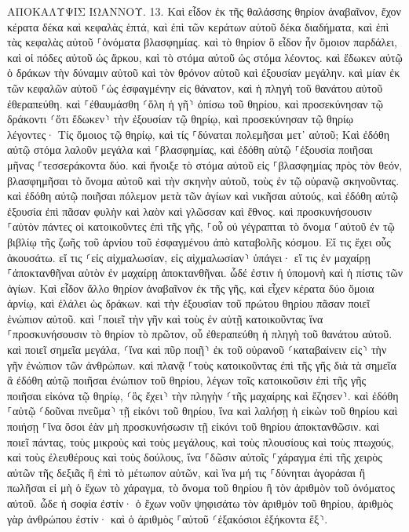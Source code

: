\documentclass[twoside, 9pt]{extreport}
\begin{document}
ΑΠΟΚΑΛΥΨΙΣ ΙΩΑΝΝΟΥ.
13.
Καὶ εἶδον ἐκ τῆς θαλάσσης θηρίον ἀναβαῖνον, ἔχον κέρατα δέκα καὶ κεφαλὰς ἑπτά, καὶ ἐπὶ τῶν κεράτων αὐτοῦ δέκα διαδήματα, καὶ ἐπὶ τὰς κεφαλὰς αὐτοῦ ⸀ὀνόματα βλασφημίας. 
καὶ τὸ θηρίον ὃ εἶδον ἦν ὅμοιον παρδάλει, καὶ οἱ πόδες αὐτοῦ ὡς ἄρκου, καὶ τὸ στόμα αὐτοῦ ὡς στόμα λέοντος. καὶ ἔδωκεν αὐτῷ ὁ δράκων τὴν δύναμιν αὐτοῦ καὶ τὸν θρόνον αὐτοῦ καὶ ἐξουσίαν μεγάλην. 
καὶ μίαν ἐκ τῶν κεφαλῶν αὐτοῦ ⸀ὡς ἐσφαγμένην εἰς θάνατον, καὶ ἡ πληγὴ τοῦ θανάτου αὐτοῦ ἐθεραπεύθη. καὶ ⸀ἐθαυμάσθη ⸂ὅλη ἡ γῆ⸃ ὀπίσω τοῦ θηρίου, 
καὶ προσεκύνησαν τῷ δράκοντι ⸂ὅτι ἔδωκεν⸃ τὴν ἐξουσίαν τῷ θηρίῳ, καὶ προσεκύνησαν τῷ θηρίῳ λέγοντες· Τίς ὅμοιος τῷ θηρίῳ, καὶ τίς ⸀δύναται πολεμῆσαι μετ᾽ αὐτοῦ; 
Καὶ ἐδόθη αὐτῷ στόμα λαλοῦν μεγάλα καὶ ⸀βλασφημίας, καὶ ἐδόθη αὐτῷ ⸀ἐξουσία ποιῆσαι μῆνας ⸀τεσσεράκοντα δύο. 
καὶ ἤνοιξε τὸ στόμα αὐτοῦ εἰς ⸀βλασφημίας πρὸς τὸν θεόν, βλασφημῆσαι τὸ ὄνομα αὐτοῦ καὶ τὴν σκηνὴν αὐτοῦ, τοὺς ἐν τῷ οὐρανῷ σκηνοῦντας. 
καὶ ἐδόθη αὐτῷ ποιῆσαι πόλεμον μετὰ τῶν ἁγίων καὶ νικῆσαι αὐτούς, καὶ ἐδόθη αὐτῷ ἐξουσία ἐπὶ πᾶσαν φυλὴν καὶ λαὸν καὶ γλῶσσαν καὶ ἔθνος. 
καὶ προσκυνήσουσιν ⸀αὐτὸν πάντες οἱ κατοικοῦντες ἐπὶ τῆς γῆς, ⸀οὗ οὐ γέγραπται τὸ ὄνομα ⸀αὐτοῦ ἐν τῷ βιβλίῳ τῆς ζωῆς τοῦ ἀρνίου τοῦ ἐσφαγμένου ἀπὸ καταβολῆς κόσμου. 
Εἴ τις ἔχει οὖς ἀκουσάτω. 
εἴ τις ⸂εἰς αἰχμαλωσίαν, εἰς αἰχμαλωσίαν⸃ ὑπάγει· εἴ τις ἐν μαχαίρῃ ⸀ἀποκτανθῆναι αὐτὸν ἐν μαχαίρῃ ἀποκτανθῆναι. ὧδέ ἐστιν ἡ ὑπομονὴ καὶ ἡ πίστις τῶν ἁγίων. 
Καὶ εἶδον ἄλλο θηρίον ἀναβαῖνον ἐκ τῆς γῆς, καὶ εἶχεν κέρατα δύο ὅμοια ἀρνίῳ, καὶ ἐλάλει ὡς δράκων. 
καὶ τὴν ἐξουσίαν τοῦ πρώτου θηρίου πᾶσαν ποιεῖ ἐνώπιον αὐτοῦ. καὶ ⸀ποιεῖ τὴν γῆν καὶ τοὺς ἐν αὐτῇ κατοικοῦντας ἵνα ⸀προσκυνήσουσιν τὸ θηρίον τὸ πρῶτον, οὗ ἐθεραπεύθη ἡ πληγὴ τοῦ θανάτου αὐτοῦ. 
καὶ ποιεῖ σημεῖα μεγάλα, ⸂ἵνα καὶ πῦρ ποιῇ⸃ ἐκ τοῦ οὐρανοῦ ⸂καταβαίνειν εἰς⸃ τὴν γῆν ἐνώπιον τῶν ἀνθρώπων. 
καὶ πλανᾷ ⸀τοὺς κατοικοῦντας ἐπὶ τῆς γῆς διὰ τὰ σημεῖα ἃ ἐδόθη αὐτῷ ποιῆσαι ἐνώπιον τοῦ θηρίου, λέγων τοῖς κατοικοῦσιν ἐπὶ τῆς γῆς ποιῆσαι εἰκόνα τῷ θηρίῳ, ⸂ὃς ἔχει⸃ τὴν πληγὴν ⸂τῆς μαχαίρης καὶ ἔζησεν⸃. 
καὶ ἐδόθη ⸀αὐτῷ ⸂δοῦναι πνεῦμα⸃ τῇ εἰκόνι τοῦ θηρίου, ἵνα καὶ λαλήσῃ ἡ εἰκὼν τοῦ θηρίου καὶ ποιήσῃ ⸀ἵνα ὅσοι ἐὰν μὴ προσκυνήσωσιν τῇ εἰκόνι τοῦ θηρίου ἀποκτανθῶσιν. 
καὶ ποιεῖ πάντας, τοὺς μικροὺς καὶ τοὺς μεγάλους, καὶ τοὺς πλουσίους καὶ τοὺς πτωχούς, καὶ τοὺς ἐλευθέρους καὶ τοὺς δούλους, ἵνα ⸀δῶσιν αὐτοῖς ⸀χάραγμα ἐπὶ τῆς χειρὸς αὐτῶν τῆς δεξιᾶς ἢ ἐπὶ τὸ μέτωπον αὐτῶν, 
καὶ ἵνα μή τις ⸀δύνηται ἀγοράσαι ἢ πωλῆσαι εἰ μὴ ὁ ἔχων τὸ χάραγμα, τὸ ὄνομα τοῦ θηρίου ἢ τὸν ἀριθμὸν τοῦ ὀνόματος αὐτοῦ. 
ὧδε ἡ σοφία ἐστίν· ὁ ἔχων νοῦν ψηφισάτω τὸν ἀριθμὸν τοῦ θηρίου, ἀριθμὸς γὰρ ἀνθρώπου ἐστίν· καὶ ὁ ἀριθμὸς ⸀αὐτοῦ ⸂ἑξακόσιοι ἑξήκοντα ἕξ⸃. 
\end{document}
